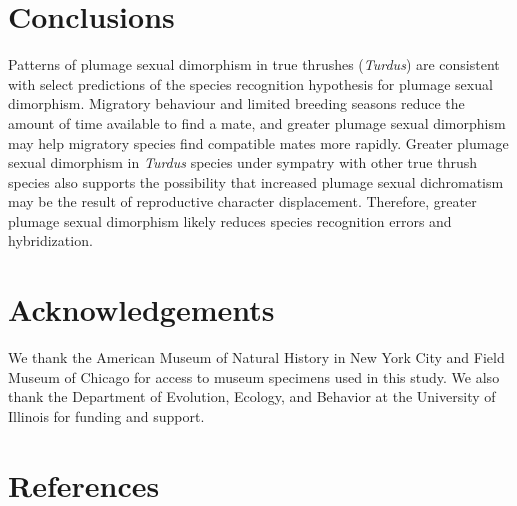 \documentclass[
  a4paper,
]{article}
\begin{document}
\hypertarget{conclusions}{%
\section{Conclusions}\label{conclusions}}

Patterns of plumage sexual dimorphism in true thrushes (\emph{Turdus})
are consistent with select predictions of the species recognition
hypothesis for plumage sexual dimorphism. Migratory behaviour and
limited breeding seasons reduce the amount of time available to find a
mate, and greater plumage sexual dimorphism may help migratory species
find compatible mates more rapidly. Greater plumage sexual dimorphism in
\emph{Turdus} species under sympatry with other true thrush species also
supports the possibility that increased plumage sexual dichromatism may
be the result of reproductive character displacement. Therefore, greater
plumage sexual dimorphism likely reduces species recognition errors and
hybridization.

\hypertarget{acknowledgements}{%
\section{Acknowledgements}\label{acknowledgements}}

We thank the American Museum of Natural History in New York City and
Field Museum of Chicago for access to museum specimens used in this
study. We also thank the Department of Evolution, Ecology, and Behavior
at the University of Illinois for funding and support.

\hypertarget{references}{%
\section*{References}\label{references}}
\end{document}
